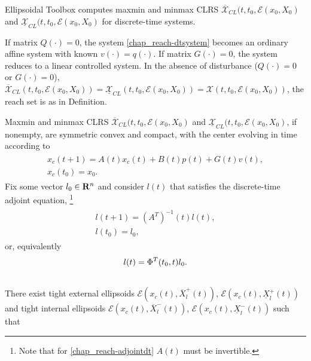 \documentclass[letterpaper,10pt,english]{sphinxmanual}
\begin{document}
Ellipsoidal Toolbox computes maxmin and minmax CLRS
$\overline{{\mathcal X}}_{CL}(t, t_0, {\mathcal E}(x_0, X_0)$ and
$\underline{{\mathcal X}}_{CL}(t, t_0, {\mathcal E}(x_0, X_0)$ for
discrete-time systems.

If matrix $Q(\cdot)=0$, the system \eqref{chap_reach-dtsystem} becomes an
ordinary affine system with known $v(\cdot)=q(\cdot)$. If matrix
$G(\cdot)=0$, the system reduces to a linear controlled system. In
the absence of disturbance ($Q(\cdot)=0$ or $G(\cdot)=0$),
$\overline{{\mathcal X}}_{CL}(t,t_0,{\mathcal E}(x_0,X_0))=\underline{{\mathcal X}}_{CL}(t,t_0,{\mathcal E}(x_0,X_0))={\mathcal X}(t,t_0,{\mathcal E}(x_0,X_0))$,
the reach set is as in Definition.

Maxmin and minmax CLRS
$\overline{{\mathcal X}}_{CL}(t, t_0, {\mathcal E}(x_0, X_0)$ and
$\underline{{\mathcal X}}_{CL}(t, t_0, {\mathcal E}(x_0, X_0)$, if
nonempty, are symmetric convex and compact, with the center evolving in
time according to
\label{chap_reach:equation-fwdcenterd}\begin{gather}
\begin{split}x_c(t+1) = A(t)x_c(t) + B(t)p(t) + G(t)v(t), \\
x_c(t_0)= x_0.\end{split}\label{chap_reach-fwdcenterd}
\end{gather}
Fix some vector $l_0\in{\bf R}^n$ and consider $l(t)$ that
satisfies the discrete-time adjoint equation, \footnote{
Note that for \eqref{chap_reach-adjointdt} $A(t)$ must be invertible.
}
\label{chap_reach:equation-adjointdt}\begin{gather}
\begin{split}l(t+1) = \left(A^T\right)^{-1}(t)l(t), \\
l(t_0) = l_0,\end{split}\label{chap_reach-adjointdt}
\end{gather}
or, equivalently
\begin{gather}
\begin{split}l(t) = \Phi^T(t_0, t)l_0 .\end{split}\notag\\\begin{split}\end{split}\notag
\end{gather}
There exist tight external ellipsoids
${\mathcal E}(x_c(t), \overline{X}^+_l(t))$,
${\mathcal E}(x_c(t), \underline{X}^+_l(t))$ and tight internal
ellipsoids ${\mathcal E}(x_c(t), \overline{X}^-_l(t))$,
${\mathcal E}(x_c(t), \underline{X}^-_l(t))$ such that
\end{document}

